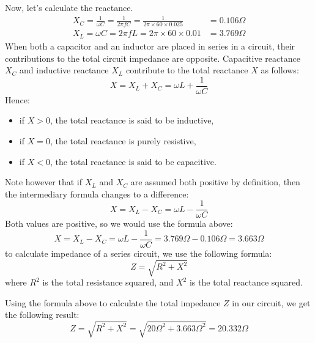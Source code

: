 \documentclass[12pt,a4paper,oneside]{article}
\begin{document}
Now, let's calculate the reactance.
\begin{align*}
	X_C = \frac{1}{\omega C} = \frac{1}{2 \pi f C} = \frac{1}{2 \pi \times 60 \times 0.025} &= 0.106\Omega \\
	X_L = \omega C = 2 \pi f L = 2 \pi \times 60 \times 0.01 &= 3.769\Omega
\end{align*}
When both a capacitor and an inductor are placed in series in a circuit, their contributions to the total circuit impedance are opposite. Capacitive reactance \(X_C\) and inductive reactance \(X_L\) contribute to the total reactance \(X\) as follows:
\[
	X = X_L + X_C = \omega L + \frac{1}{\omega C}
\]
Hence:
\begin{itemize}
	\item if \(X>0\), the total reactance is said to be inductive,
	\item if \(X=0\), the total reactance is purely resistive,
	\item if \(X<0\), the total reactance is said to be capacitive.
\end{itemize}
Note however that if \(X_L\) and \(X_C\) are assumed both positive by definition, then the intermediary formula changes to a difference:
\[
	X = X_L - X_C = \omega L - \frac{1}{\omega C}
\]
Both values are positive, so we would use the formula above:
\[
	X = X_L - X_C = \omega L - \frac{1}{\omega C} = 3.769\Omega - 0.106\Omega = 3.663\Omega
\]
to calculate impedance of a series circuit, we use the following formula:
\[
	Z = \sqrt{R^2 + X^2}
\]
where \(R^2\) is the total resistance squared, and \(X^2\) is the total reactance squared.

Using the formula above to calculate the total impedance \(Z\) in our circuit, we get the following result:
\[
	Z = \sqrt{R^2 + X^2} = \sqrt{20\Omega^2 + 3.663\Omega^2} = 20.332\Omega
\]
\end{document}
